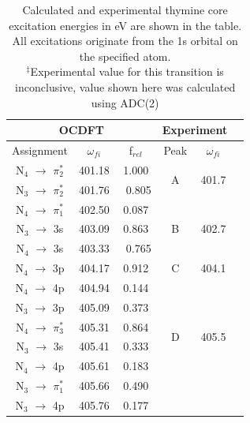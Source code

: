 \documentclass[11.5pt]{article}
\begin{document}
\begin{table}
\centering
    \begin{tabular}{c@{\hskip 0.22in}c@{\hskip 0.22in}c@{\hskip 0.52in}c@{\hskip 0.22in}c@{\hskip 0.22in}c}
    \hline
    \hline
  \multicolumn{3}{c}{OCDFT} &\multicolumn{2}{c}{Experiment} \\
  \hline
  Assignment & $\omega_{fi}$ & f$_{rel}$ & Peak &  $\omega_{fi}$   \\
  \hline
   N$_4$ $\rightarrow$ $\pi_2^*$ & 401.18 & 1.000 &  \multirow{2}{*}{A} &\multirow{2}{*}{401.7}\\
   N$_3$ $\rightarrow$ $\pi_2^*$ & 401.76 & \ 0.805
   \vspace{2mm}\\
   N$_4$ $\rightarrow$ $\pi_1^*$ & 402.50 & 0.087 & \multirow{3}{*}{B} & \multirow{3}{*}{402.7}\\
   N$_3$ $\rightarrow$ 3s & 403.09 & 0.863\\
   N$_4$ $\rightarrow$ 3s & 403.33 & \ 0.765 
   \vspace{2mm}\\
   N$_4$ $\rightarrow$ 3p & 404.17 & 0.912 & C & 404.1 
   \vspace{2mm}\\
   N$_4$ $\rightarrow$ 4p & 404.94 & 0.144 & \multirow{6}{*}{D} & \multirow{6}{*}{405.5}\\
   N$_3$ $\rightarrow$ 3p & 405.09 & 0.373\\
   N$_4$ $\rightarrow$ $\pi_3^*$ & 405.31 & 0.864\\
   N$_3$ $\rightarrow$ 3s & 405.41 & 0.333\\
   N$_4$ $\rightarrow$ 4p & 405.61 & 0.183\\
   N$_3$ $\rightarrow$ $\pi_1^*$& 405.66 & 0.490\\
   N$_3$ $\rightarrow$ 4p & 405.76 & 0.177\\
   \hline
  \end{tabular}
      \caption{Calculated and experimental thymine core excitation energies in eV are shown in the table. All excitations originate from the 1s orbital on the specified atom. \\
  $^{\ddagger}$Experimental value for this transition is inconclusive, value shown here was calculated using ADC(2)}
  \label{figure:MOs}
  \end{table}
\end{document}
